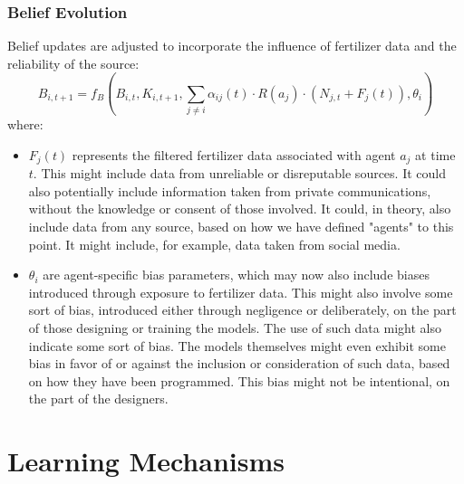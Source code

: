 \documentclass[12pt, a4paper]{article}
\begin{document}
\subsubsection{Belief Evolution}
Belief updates are adjusted to incorporate the influence of fertilizer data and the reliability of the source:
\begin{equation}
    B_{i,t+1} = f_B(B_{i,t}, K_{i,t+1}, \sum_{j \neq i} \alpha_{ij}(t) \cdot R(a_j) \cdot (N_{j,t} + F_j(t)), \theta_i)
\end{equation}
where:
\begin{itemize}
    \item \( F_j(t) \) represents the filtered fertilizer data associated with agent \( a_j \) at time \( t \). This might include data from unreliable or disreputable sources. It could also potentially include information taken from private communications, without the knowledge or consent of those involved. It could, in theory, also include data from any source, based on how we have defined "agents" to this point. It might include, for example, data taken from social media.
    \item \( \theta_i \) are agent-specific bias parameters, which may now also include biases introduced through exposure to fertilizer data. This might also involve some sort of bias, introduced either through negligence or deliberately, on the part of those designing or training the models. The use of such data might also indicate some sort of bias. The models themselves might even exhibit some bias in favor of or against the inclusion or consideration of such data, based on how they have been programmed. This bias might not be intentional, on the part of the designers.
\end{itemize}

\section{Learning Mechanisms}
\end{document}
